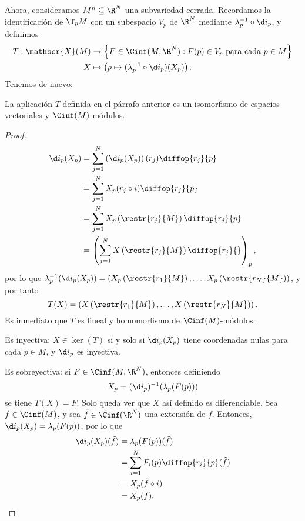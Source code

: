 Ahora, consideramos $M^{n}\subseteq \R^{N}$ una subvariedad cerrada. Recordamos
la identificación de $\T_{p}M$ con un subespacio $V_{p}$ de $\R^{N}$ mediante
$\lambda_{p}^{-1}\circ\d i_{p}$, y definimos
\begin{alignat*}{2}
  T: \mathscr{X}(M) & \to \left\{ F\in\Cinf(M,\R^{N}) : F(p)\in V_{p}\text{ para
      cada } p\in M \right\} \\
 X & \mapsto \left(p\mapsto (\lambda_{p}^{-1}\circ\d i_{p})(X_{p}) \right).
\end{alignat*}
Tenemos de nuevo:
\begin{nprop}
  La aplicación $T$ definida en el párrafo anterior es un isomorfismo de
  espacios vectoriales y $\Cinf(M)$-módulos.
\end{nprop}
\begin{proof}
  \begin{align*}
    \d i_{p}(X_{p}) & = \sum_{j=1}^{N} \left(\d i_{p}(X_{p})\right)(r_{j})
                      \diffop{r_{j}}{p} \\
                    & = \sum_{j=1}^{N}X_{p}(r_{j}\circ i) \diffop{r_{j}}{p} \\
                    & = \sum_{j=1}^{N} X_{p}\left(\restr{r_{j}}{M}\right) \diffop{r_{j}}{p}
    \\
                    & = \left( \sum_{j=1}^{N}X\left(\restr{r_{j}}{M}\right)\diffop{r_{j}}{} \right)_{p},
  \end{align*}
  por lo que $\lambda_{p}^{-1}(\d i_{p}(X_{p})) = \left(X_{p}\left(\restr{r_{1}}{M}\right),
  \dots, X_{p}\left(\restr{r_{N}}{M}\right)\right)$, y por tanto
  \[
    T(X) = \left(X\left(\restr{r_{1}}{M}\right), \dots, X\left(\restr{r_{N}}{M}\right)\right)
    .\]
  Es inmediato que $T$ es lineal y homomorfismo de $\Cinf(M)$-módulos.

  Es inyectiva: $X\in\ker(T)$ si y solo si $\d i_{p}(X_{p})$ tiene coordenadas
  nulas para cada $p\in M$, y $\d i_{p}$ es inyectiva. 

  Es sobreyectiva: si $F\in\Cinf(M,\R^{N})$, entonces definiendo
  \[
    X_{p} = (\d i_{p})^{-1}(\lambda_{p}(F(p)))
  \]
  se tiene $T(X)=F$. Solo queda ver que $X$ así definido es diferenciable. Sea
  $f\in\Cinf(M)$, y sea $\tilde{f}\in\Cinf(\R^{N})$ una extensión de
  $f$. Entonces, $\d i_{p}(X_{p}) = \lambda_{p}(F(p))$, por lo que
  \begin{align*}
    \d i_{p}(X_{p})(\tilde{f}) & = \lambda_{p}(F(p))(\tilde{f}) \\
                    & = \sum_{i=1}^{N}F_{i}(p) \diffop{r_{i}}{p}(\tilde{f}) \\
                    & = X_{p}(\tilde{f}\circ i) \\
                    & = X_{p}(f).
  \end{align*}
\end{proof}

